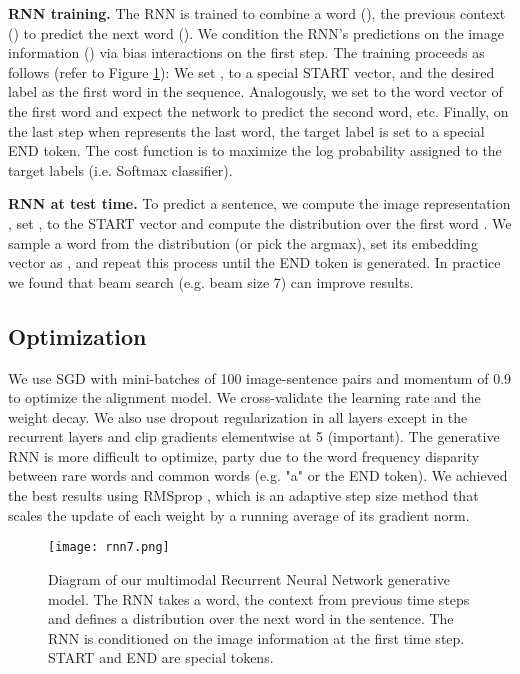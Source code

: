 \documentclass[10pt,twocolumn,letterpaper]{article}
\begin{document}
\textbf{RNN training.} The RNN is trained to combine a word (), the previous context ()  to predict the next word (). We condition the RNN's predictions on the image information () via bias interactions on the first step. The training proceeds as follows (refer to Figure \ref{fig:rnn}): We set ,  to a special START vector, and the desired label  as the first word in the sequence. Analogously, we set  to the word vector of the first word and expect the network to predict the second word, etc. Finally, on the last step when  represents the last word, the target label is set to a special END token. The cost function is to maximize the log probability assigned to the target labels (i.e. Softmax classifier).

\textbf{RNN at test time.} To predict a sentence, we compute the image representation , set ,  to the START vector and compute the distribution over the first word . We sample a word from the distribution (or pick the argmax), set its embedding vector as , and repeat this process until the END token is generated. In practice we found that beam search (e.g. beam size 7) can improve results.

\vspace{-0.05in}
\subsection{Optimization}
\vspace{-0.15in}

We use SGD with mini-batches of 100 image-sentence pairs and momentum of 0.9 to optimize the alignment model. We cross-validate the learning rate and the weight decay. We also use dropout regularization in all layers except in the recurrent layers \cite{zaremba2014recurrent} and clip gradients elementwise at 5 (important). The generative RNN is more difficult to optimize, party due to the word frequency disparity between rare words and common words (e.g. "a" or the END token). We achieved the best results using RMSprop \cite{rmsprop}, which is an adaptive step size method that scales the update of each weight by a running average of its gradient norm.



\begin{figure}
\centering
\texttt{[image: rnn7.png]}
\caption{Diagram of our multimodal Recurrent Neural Network generative model. The RNN takes a word, the context from previous time steps and defines a distribution over the next word in the sentence. The RNN is conditioned on the image information at the first time step. START and END are special tokens.}
\vspace{-0.1in}
\label{fig:rnn}
\end{figure}
\end{document}
